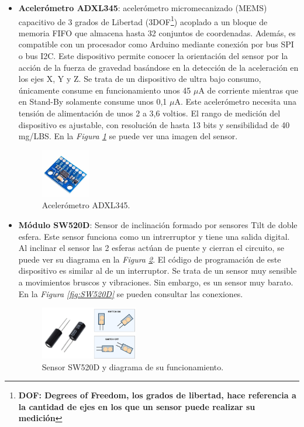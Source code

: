 \begin{itemize}
    \item \textbf{Acelerómetro ADXL345}\cite{ADXL345}: acelerómetro micromecanizado (MEMS) capacitivo de 3 grados de Libertad (3DOF\footnote{\textbf{DOF: Degrees of Freedom, los grados de libertad, hace referencia a la cantidad de ejes en los que un sensor puede realizar su medición}}) acoplado a un bloque de memoria FIFO que almacena hasta 32 conjuntos de coordenadas. Además, es compatible con un procesador como Arduino mediante conexión por bus SPI o bus I2C. Este dispositivo permite conocer la orientación del sensor por la acción de la fuerza de gravedad basándose en la detección de la aceleración en los ejes X, Y y Z. Se trata de un dispositivo de ultra bajo consumo, únicamente consume en funcionamiento unos 45 $\mu$A de corriente mientras que en Stand-By solamente consume unos 0,1 $\mu$A. Este acelerómetro necesita una tensión de alimentación de unos 2 a 3,6 voltios. El rango de medición del dispositivo es ajustable, con resolución de hasta 13 bits y sensibilidad de 40 mg/LBS. En la \textit{Figura \ref{fig:ADXL345}} se puede ver una imagen del sensor.
\begin{figure}[h!]
    \centering
    \includegraphics[width=0.2\textwidth]{img/ADXL345.jpeg}
    \caption{Acelerómetro ADXL345\cite{imgADXL345}.}
    \label{fig:ADXL345} 
\end{figure}

    \item \textbf{Módulo SW520D}\cite{SW520D_1}: Sensor de inclinación formado por sensores Tilt de doble esfera. Este sensor funciona como un intrerruptor y tiene una salida digital. Al inclinar el sensor las 2 esferas actúan de puente y cierran el circuito, se puede ver su diagrama en la \textit{Figura \ref{fig:imgSW520D}}. El código de programación de este dispositivo es similar al de un interruptor. Se trata de un sensor muy sensible a movimientos bruscos y vibraciones. Sin embargo, es un sensor muy barato. En la \textit{Figura \ref{fig:SW520D}} se pueden consultar las conexiones.
\begin{figure}[h!]
    \centering
    \includegraphics[width=0.4\textwidth]{img/imgSW520D_diag.png}
    \caption{Sensor SW520D\cite{imgSW520D} y diagrama de su funcionamiento.}
    \label{fig:imgSW520D} 
\end{figure}


\end{itemize}

